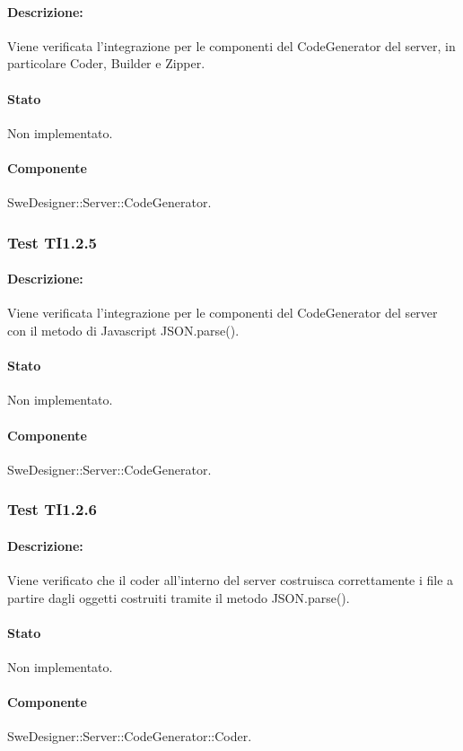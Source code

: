 \documentclass[../PianoDiQualifica.tex]{subfiles}
\begin{document}
	\paragraph{Descrizione:} Viene verificata l'integrazione per le componenti del CodeGenerator del server, in particolare Coder, Builder e Zipper.
	\paragraph{Stato} Non implementato.
	\paragraph{Componente} SweDesigner::Server::CodeGenerator.
	
	\subsubsection{Test TI1.2.5}
	\paragraph{Descrizione:} Viene verificata l'integrazione per le componenti del CodeGenerator del server con il metodo di Javascript JSON.parse().
	\paragraph{Stato} Non implementato.
	\paragraph{Componente} SweDesigner::Server::CodeGenerator.
	
	\subsubsection{Test TI1.2.6}
	\paragraph{Descrizione:} Viene verificato che il coder all'interno del server costruisca correttamente i file a partire dagli oggetti costruiti tramite il metodo JSON.parse().
	\paragraph{Stato} Non implementato.
	\paragraph{Componente} SweDesigner::Server::CodeGenerator::Coder.
\end{document}
